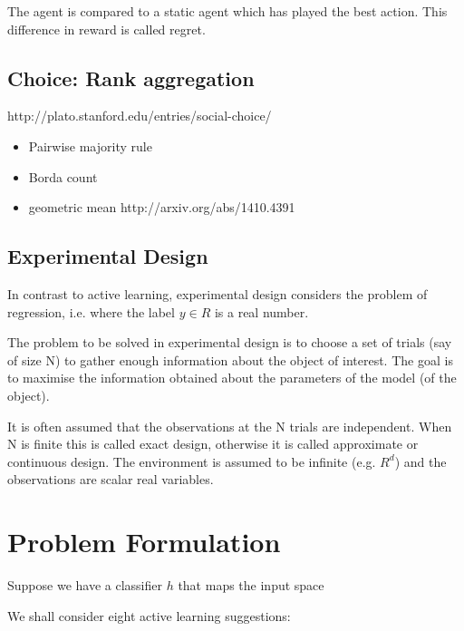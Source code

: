 \documentclass[fleqn,10pt,lineno]{wlpeerj} %
\begin{document}
The agent is compared to a static agent which has played the best
action. This difference in reward is called regret.

\subsection*{Choice: Rank aggregation}

http://plato.stanford.edu/entries/social-choice/

\begin{itemize}
  \item Pairwise majority rule
  \item Borda count
  \item geometric mean http://arxiv.org/abs/1410.4391
\end{itemize}


\subsection*{Experimental Design}

In contrast to active learning, experimental design considers the problem of regression, i.e. where the label $y\in R$ is a real number.

The problem to be solved in experimental design is to choose a set of
trials (say of size N) to gather enough information about the object
of interest. The goal is to maximise the information obtained about
the parameters of the model (of the object).

It is often assumed that the observations at the N trials are
independent. When N is finite this is called exact design, otherwise
it is called approximate or continuous design. The environment is
assumed to be infinite (e.g. $R^d$) and the observations are scalar real variables.

\section*{Problem Formulation}

Suppose we have a classifier $h$ that maps the input space

We shall consider eight active learning suggestions:
\end{document}
